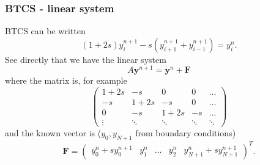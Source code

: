 \documentclass{beamer}
\newcommand{\by}{{\boldsymbol{y}}}
\newcommand{\bfm}[1]{{\boldsymbol{#1}}}
\begin{document}
\begin{frame}
  \frametitle{BTCS - linear system}

  BTCS can be written
  \begin{equation*}
    (1 + 2 s) y_i^{n+1} - s \left( y_{i+1}^{n+1} + y_{i-1}^{n+1}
    \right) = y_i^n.
  \end{equation*} \pause
  See directly that we have the linear system
  \begin{equation*}
    A \by^{n+1} = \by^n + \bfm{F}
  \end{equation*}
  where the matrix is, for example
  \begin{equation*}
    \begin{pmatrix}
      1 + 2 s & -s & 0 & 0 & \dots \\
      -s & 1 + 2 s & -s & 0 & \dots \\
      0 & -s & 1 + 2 s & -s & \dots \\
      \vdots & \ddots & \ddots & \ddots & \ddots
    \end{pmatrix}
  \end{equation*} \pause
  and the known vector is ($y_0, y_{N+1}$ from boundary conditions)
  \begin{equation*}
    \bfm{F} =
    \begin{pmatrix}
       y_0^n + s y_0^{n+1} & y_1^n & \dots & y_2^n & y_{N+1}^n + s y_{N+1}^{n+1}
    \end{pmatrix}^T.
  \end{equation*}

\end{frame}
\end{document}
